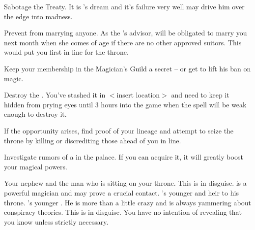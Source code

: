 \documentclass[char]{NeptuneBall}
\begin{document}
\begin{itemz}[Goals]
  \item Sabotage the Treaty. It is \cKing{}'s dream and it's failure very well may drive him over the edge into madness.
  \item Prevent \cPrincess{} from marrying anyone. As the \cKing{\King}'s advisor, \cPrincess{\they} will be obligated to marry you next month when she comes of age if there are no other approved suitors. This would put you first in line for the throne.
  \item Keep your membership in the Magician's Guild a secret -- or get \cKing{\King} \cKing{} to lift his ban on magic.
  \item Destroy the \iMusicBox{}. You've stashed it in $<$insert location$>$ and need to keep it hidden from prying eyes until 3 hours into the game when the spell will be weak enough to destroy it.
  \item If the opportunity arises, find proof of your lineage and attempt to seize the throne by killing or discrediting those ahead of you in line.
  \item Investigate rumors of a \iGlowShell{\MYname} in the palace. If you can acquire it, it will greatly boost your magical powers.
\end{itemz}

\begin{contacts}
  \contact{\cKing{}} Your nephew and the man who is sitting on your throne.
  \contact{\cWitch{\MYname}} This is \cWitch{} in disguise. \cWitch{\They} is a powerful magician and may prove a crucial contact.
  \contact{\cPrincess{}} \cKing{}'s younger \cPrincess{\offspring} and heir to his throne.
  \contact{\cPlant{}} \cKing{}'s younger \cPlant{\sibling}. He is more than a little crazy and is always yammering about conspiracy theories.
  \contact{\cQueen{\MYname}} This is \cQueen{} in disguise. You have no intention of revealing that you know \cQueen{\them} unless strictly necessary.
\end{contacts}
\end{document}
